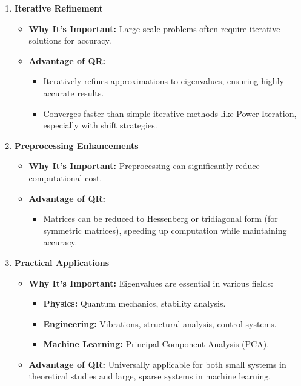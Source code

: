 \documentclass[journal]{IEEEtran}
\begin{document}
\begin{enumerate}
    \item \textbf{Iterative Refinement}
    \begin{itemize}
        \item \textbf{Why It's Important:} Large-scale problems often require iterative solutions for accuracy.
        \item \textbf{Advantage of QR:}
        \begin{itemize}
            \item Iteratively refines approximations to eigenvalues, ensuring highly accurate results.
            \item Converges faster than simple iterative methods like Power Iteration, especially with shift strategies.
        \end{itemize}
    \end{itemize}
    
    \item \textbf{Preprocessing Enhancements}
    \begin{itemize}
        \item \textbf{Why It's Important:} Preprocessing can significantly reduce computational cost.
        \item \textbf{Advantage of QR:} 
        \begin{itemize}
            \item Matrices can be reduced to Hessenberg or tridiagonal form (for symmetric matrices), speeding up computation while maintaining accuracy.
        \end{itemize}
    \end{itemize}
    
    \item \textbf{Practical Applications}
    \begin{itemize}
        \item \textbf{Why It's Important:} Eigenvalues are essential in various fields:
        \begin{itemize}
            \item \textbf{Physics:} Quantum mechanics, stability analysis.
            \item \textbf{Engineering:} Vibrations, structural analysis, control systems.
            \item \textbf{Machine Learning:} Principal Component Analysis (PCA).
        \end{itemize}
        \item \textbf{Advantage of QR:} Universally applicable for both small systems in theoretical studies and large, sparse systems in machine learning.
    \end{itemize}
\end{enumerate}
\end{document}
